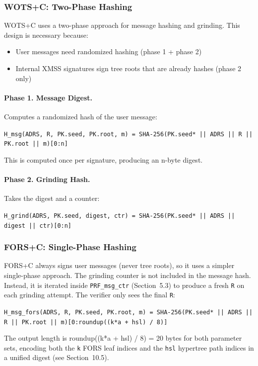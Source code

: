 \subsubsection{WOTS+C: Two-Phase Hashing}
WOTS+C uses a two-phase approach for message hashing and grinding. This design is necessary because:
\begin{itemize}
    \item User messages need randomized hashing (phase 1 + phase 2)
    \item Internal XMSS signatures sign tree roots that are already hashes (phase 2 only)
\end{itemize}

\paragraph{Phase 1. Message Digest.} Computes a randomized hash of the user message:
\begin{center}
    \texttt{H\_msg(ADRS, R, PK.seed, PK.root, m) = SHA-256(PK.seed* || ADRS || R || PK.root || m)[0:n]}
\end{center}
This is computed once per signature, producing an n-byte digest.

\paragraph{Phase 2. Grinding Hash.} Takes the digest and a counter:
\begin{center}
    \texttt{H\_grind(ADRS, PK.seed, digest, ctr) = SHA-256(PK.seed* || ADRS || digest || ctr)[0:n]}
\end{center}

\subsubsection{FORS+C: Single-Phase Hashing}
FORS+C always signs user messages (never tree roots), so it uses a simpler single-phase approach. The grinding counter is not included in the message hash. Instead, it is iterated inside \texttt{PRF\_msg\_ctr} (Section~5.3) to produce a fresh \texttt{R} on each grinding attempt. The verifier only sees the final \texttt{R}:
\begin{center}
    \texttt{H\_msg\_fors(ADRS, R, PK.seed, PK.root, m) = SHA-256(PK.seed* || ADRS || R || PK.root || m)[0:roundup((k*a + hsl) / 8)]}
\end{center}

The output length is roundup((k*a + hsl) / 8) = 20 bytes for both parameter sets, encoding both the \texttt{k} FORS leaf indices and the \texttt{hsl} hypertree path indices in a unified digest (see Section~10.5).

